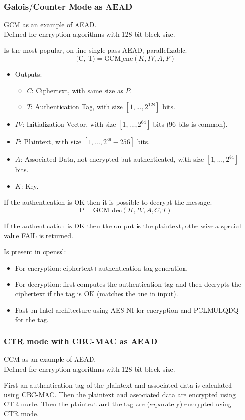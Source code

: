 \subsubsection{Galois/Counter Mode as AEAD}
\begin{center}
    GCM as an example of AEAD. \\ Defined for encryption algorithms with 128-bit block size.
\end{center}
Is the most popular, on-line single-pass AEAD, parallelizable.
\[
    \text{(C, T)} = \text{GCM\_enc}(K, IV, A, P)
\]
\begin{itemize}
    \item Outputs:
    \begin{itemize}
        \item $C$: Ciphertext, with same size as $P$.
        \item $T$: Authentication Tag, with size $[1, ..., 2^{128}]$ bits.
    \end{itemize}
    \item $IV$: Initialization Vector, with size $[1, ..., 2^{64}]$ bits (96 bits is common).
    \item $P$: Plaintext, with size $[1, ..., 2^{39}-256]$ bits.
    \item $A$: Associated Data, not encrypted but authenticated, with size $[1, ..., 2^{64}]$ bits.
    \item $K$: Key.
\end{itemize}

If the authentication is OK then it is possible to decrypt the message.
\[
    \text{P} = \text{GCM\_dec}(K, IV, A, C, T)
\]
\begin{tcolorbox}[colback=blue!10!white, colframe=blue!50!white, title=Output of decryption]
    If the authentication is OK then the output is the plaintext, otherwise a special value FAIL is returned.
\end{tcolorbox}
Is present in openssl:
\begin{itemize}
    \item For encryption: ciphertext+authentication-tag generation.
    \item For decryption: first computes the authentication tag and then decrypts the ciphertext if the tag is OK (matches the one in input).
    \item Fast on Intel architecture using AES-NI for encryption and PCLMULQDQ for the tag.
\end{itemize}

\subsubsection{CTR mode with CBC-MAC as AEAD}
\begin{center}
    CCM as an example of AEAD. \\ Defined for encryption algorithms with 128-bit block size.
\end{center}
First an authentication tag of the plaintext and associated data is calculated using CBC-MAC. Then the plaintext and associated data are encrypted using CTR mode. Then the plaintext and the tag are (separately) encrypted using CTR mode.

